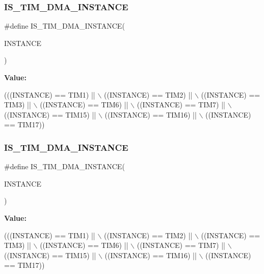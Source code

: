 \subsubsection{\texorpdfstring{I\+S\+\_\+\+T\+I\+M\+\_\+\+D\+M\+A\+\_\+\+I\+N\+S\+T\+A\+N\+CE}{IS\_TIM\_DMA\_INSTANCE}\hspace{0.1cm}{\footnotesize\ttfamily [13/16]}}
{\footnotesize\ttfamily \#define I\+S\+\_\+\+T\+I\+M\+\_\+\+D\+M\+A\+\_\+\+I\+N\+S\+T\+A\+N\+CE(\begin{DoxyParamCaption}\item[{}]{I\+N\+S\+T\+A\+N\+CE }\end{DoxyParamCaption})}

{\bfseries Value\+:}
\begin{DoxyCode}
(((INSTANCE) == TIM1)    || \(\backslash\)
   ((INSTANCE) == TIM2)    || \(\backslash\)
   ((INSTANCE) == TIM3)    || \(\backslash\)
   ((INSTANCE) == TIM6)    || \(\backslash\)
   ((INSTANCE) == TIM7)    || \(\backslash\)
   ((INSTANCE) == TIM15)   || \(\backslash\)
   ((INSTANCE) == TIM16)   || \(\backslash\)
   ((INSTANCE) == TIM17))
\end{DoxyCode}
\mbox{\label{group___exported__macro_gad51d77b3bcc12a3a5c308d727b561371}} 
\subsubsection{\texorpdfstring{I\+S\+\_\+\+T\+I\+M\+\_\+\+D\+M\+A\+\_\+\+I\+N\+S\+T\+A\+N\+CE}{IS\_TIM\_DMA\_INSTANCE}\hspace{0.1cm}{\footnotesize\ttfamily [14/16]}}
{\footnotesize\ttfamily \#define I\+S\+\_\+\+T\+I\+M\+\_\+\+D\+M\+A\+\_\+\+I\+N\+S\+T\+A\+N\+CE(\begin{DoxyParamCaption}\item[{}]{I\+N\+S\+T\+A\+N\+CE }\end{DoxyParamCaption})}

{\bfseries Value\+:}
\begin{DoxyCode}
(((INSTANCE) == TIM1)    || \(\backslash\)
   ((INSTANCE) == TIM2)    || \(\backslash\)
   ((INSTANCE) == TIM3)    || \(\backslash\)
   ((INSTANCE) == TIM6)    || \(\backslash\)
   ((INSTANCE) == TIM7)    || \(\backslash\)
   ((INSTANCE) == TIM15)   || \(\backslash\)
   ((INSTANCE) == TIM16)   || \(\backslash\)
   ((INSTANCE) == TIM17))
\end{DoxyCode}
\mbox{\label{group___exported__macro_gad51d77b3bcc12a3a5c308d727b561371}} 
